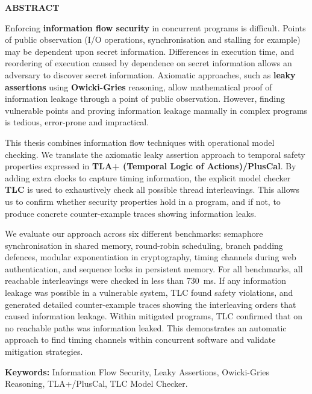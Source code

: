 \documentclass[a4paper,12pt]{report}
\begin{document}
    \vspace*{0.5cm}
    \begin{center}
        {\fontsize{18}{22}\selectfont \textbf{ABSTRACT}\par}
    \end{center}

    \vspace{0.6cm}

    Enforcing \textbf{information flow security} in concurrent programs is difficult. Points of public observation (I/O operations, synchronisation and stalling for example) may be dependent upon secret information. Differences in execution time, and reordering of execution caused by dependence on secret information allows an adversary to discover secret information. Axiomatic approaches, such as \textbf{leaky assertions} using \textbf{Owicki-Gries} reasoning, allow mathematical proof of information leakage through a point of public observation. However, finding vulnerable points and proving information leakage manually in complex programs is tedious, error-prone and impractical.

    This thesis combines information flow techniques with operational model checking. We translate the axiomatic leaky assertion approach to temporal safety properties expressed in \textbf{TLA+ (Temporal Logic of Actions)\slash PlusCal}. By adding extra clocks to capture timing information, the explicit model checker \textbf{TLC} is used to exhaustively check all possible thread interleavings. This allows us to confirm whether security properties hold in a program, and if not, to produce concrete counter-example traces showing information leaks.

    We evaluate our approach across six different benchmarks: semaphore synchronisation in shared memory, round-robin scheduling, branch padding defences, modular exponentiation in cryptography, timing channels during web authentication, and sequence locks in persistent memory. For all benchmarks, all reachable interleavings were checked in less than 730~ms. If any information leakage was possible in a vulnerable system, TLC found safety violations, and generated detailed counter-example traces showing the interleaving orders that caused information leakage. Within mitigated programs, TLC confirmed that on no reachable paths was information leaked. This demonstrates an automatic approach to find timing channels within concurrent software and validate mitigation strategies.

    \vspace{0.5cm}
    \noindent\textbf{Keywords:} Information Flow Security, Leaky Assertions, Owicki-Gries Reasoning, TLA+\slash PlusCal, TLC Model Checker.
\end{document}
